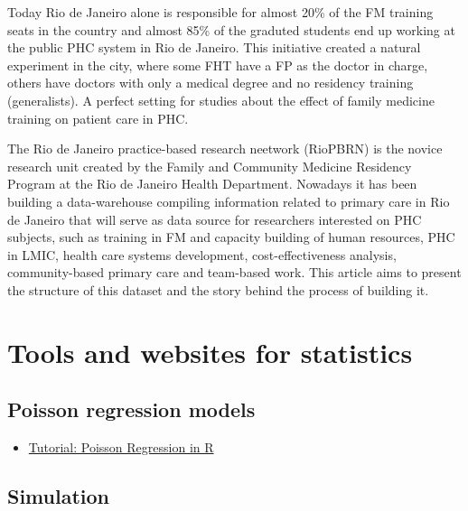 \documentclass[]{book}
\providecommand{\tightlist}{%
  \setlength{\itemsep}{0pt}\setlength{\parskip}{0pt}}
\begin{document}
Today Rio de Janeiro alone is responsible for almost 20\% of the FM training seats in the country and almost 85\% of the graduted students end up working at the public PHC system in Rio de Janeiro. This initiative created a natural experiment in the city, where some FHT have a FP as the doctor in charge, others have doctors with only a medical degree and no residency training (generalists). A perfect setting for studies about the effect of family medicine training on patient care in PHC.

The Rio de Janeiro practice-based research neetwork (RioPBRN) is the novice research unit created by the Family and Community Medicine Residency Program at the Rio de Janeiro Health Department. Nowadays it has been building a data-warehouse compiling information related to primary care in Rio de Janeiro that will serve as data source for researchers interested on PHC subjects, such as training in FM and capacity building of human resources, PHC in LMIC, health care systems development, cost-effectiveness analysis, community-based primary care and team-based work. This article aims to present the structure of this dataset and the story behind the process of building it.

\hypertarget{tools-and-websites-for-statistics}{%
\chapter*{Tools and websites for statistics}\label{tools-and-websites-for-statistics}}

\hypertarget{poisson-regression-models}{%
\section*{Poisson regression models}\label{poisson-regression-models}}

\begin{itemize}
\tightlist
\item
  \href{https://www.dataquest.io/blog/tutorial-poisson-regression-in-r/}{Tutorial: Poisson Regression in R}
\end{itemize}

\hypertarget{simulation}{%
\section*{Simulation}\label{simulation}}
\end{document}
